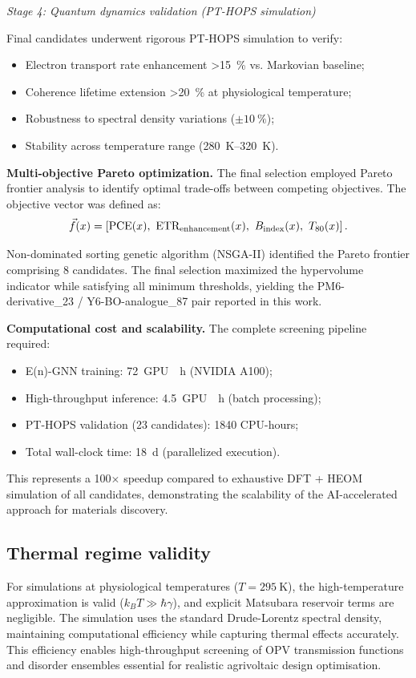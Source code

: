 \textit{Stage 4: Quantum dynamics validation (PT-HOPS simulation)}

Final candidates underwent rigorous PT-HOPS simulation to verify:
\begin{itemize}
    \item Electron transport rate enhancement \SI{>15}{\percent} vs. Markovian baseline;
    \item Coherence lifetime extension \SI{>20}{\percent} at physiological temperature;
    \item Robustness to spectral density variations ($\pm\SI{10}{\percent}$);
    \item Stability across temperature range (\SIrange{280}{320}{\kelvin}).
\end{itemize}

\textbf{Multi-objective Pareto optimization.} The final selection employed Pareto frontier analysis to identify optimal trade-offs between competing objectives. The objective vector was defined as:
\begin{equation}
\vec{f}(x) = \left[ \text{PCE}(x),~ \text{ETR}_{\rm enhancement}(x),~ B_{\rm index}(x),~ T_{80}(x) \right].
\end{equation}

Non-dominated sorting genetic algorithm (NSGA-II) identified the Pareto frontier comprising 8 candidates. The final selection maximized the hypervolume indicator while satisfying all minimum thresholds, yielding the PM6-derivative\_23 / Y6-BO-analogue\_87 pair reported in this work.

\textbf{Computational cost and scalability.} The complete screening pipeline required:
\begin{itemize}
    \item E(n)-GNN training: \SI{72}{GPU\text{-}\hour} (NVIDIA A100);
    \item High-throughput inference: \SI{4.5}{GPU\text{-}\hour} (batch processing);
    \item PT-HOPS validation (\num{23} candidates): \num{1840} CPU-hours;
    \item Total wall-clock time: \SI{18}{\day} (parallelized execution).
\end{itemize}

This represents a \num{100}$\times$ speedup compared to exhaustive DFT + HEOM simulation of all candidates, demonstrating the scalability of the AI-accelerated approach for materials discovery.

\subsection{Thermal regime validity}

For simulations at physiological temperatures ($T = \SI{295}{\kelvin}$), the high-temperature approximation is valid ($k_B T \gg \hbar\gamma$), and explicit Matsubara reservoir terms are negligible. The simulation uses the standard Drude-Lorentz spectral density, maintaining computational efficiency while capturing thermal effects accurately. This efficiency enables high-throughput screening of OPV transmission functions and disorder ensembles essential for realistic agrivoltaic design optimisation.
